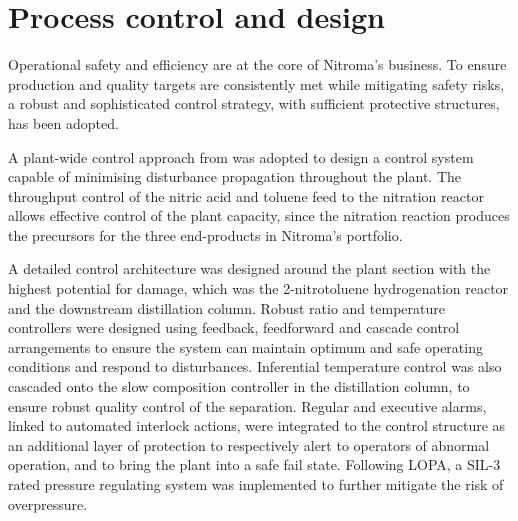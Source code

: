 \section*{Process control and design}

Operational safety and efficiency are at the core of Nitroma's business. To ensure production and quality targets are consistently met while mitigating safety risks, a robust and sophisticated control strategy, with sufficient protective structures, has been adopted.

A plant-wide control approach from \textcite{luyben_plantwide_1997} was adopted to design a control system capable of minimising disturbance propagation throughout the plant.  The throughput control of the nitric acid and toluene feed to the nitration reactor allows effective control of the plant capacity, since the nitration reaction produces the precursors for the three end-products in Nitroma's portfolio.   


A detailed control architecture was designed around the plant section with the highest potential for damage, which was the 2-nitrotoluene hydrogenation reactor and the downstream distillation column. Robust ratio and temperature controllers were designed using feedback, feedforward and cascade control arrangements to ensure the system can maintain optimum and safe operating conditions and respond to disturbances. Inferential temperature control was also cascaded onto the slow composition controller in the distillation column, to ensure robust quality control of the separation. Regular and executive alarms, linked to automated interlock actions, were integrated to the control structure as an additional layer of protection to respectively alert to operators of abnormal operation, and to bring the plant into a safe fail state. Following LOPA, a SIL-3 rated pressure regulating system was implemented to further mitigate the risk of overpressure.




